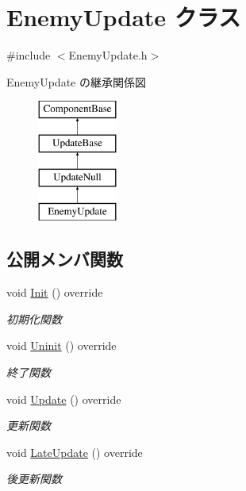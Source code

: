 \hypertarget{class_enemy_update}{}\section{Enemy\+Update クラス}
\label{class_enemy_update}


{\ttfamily \#include $<$Enemy\+Update.\+h$>$}

Enemy\+Update の継承関係図\begin{figure}[H]
\begin{center}
\leavevmode
\includegraphics[height=4.000000cm]{class_enemy_update}
\end{center}
\end{figure}
\subsection*{公開メンバ関数}
\begin{DoxyCompactItemize}
\item 
void \mbox{\hyperlink{class_enemy_update_a5b68696e964f71fca73c9143e3770c9d}{Init}} () override
\begin{DoxyCompactList}\small\item\em 初期化関数 \end{DoxyCompactList}\item 
void \mbox{\hyperlink{class_enemy_update_a294a5d4c65551af43e933cb65036f279}{Uninit}} () override
\begin{DoxyCompactList}\small\item\em 終了関数 \end{DoxyCompactList}\item 
void \mbox{\hyperlink{class_enemy_update_ae9662f3a2d064dc69c0d68293e60f051}{Update}} () override
\begin{DoxyCompactList}\small\item\em 更新関数 \end{DoxyCompactList}\item 
void \mbox{\hyperlink{class_enemy_update_ae14e4ebb42ad9043534e53edcba5b242}{Late\+Update}} () override
\begin{DoxyCompactList}\small\item\em 後更新関数 \end{DoxyCompactList}\end{DoxyCompactItemize}


